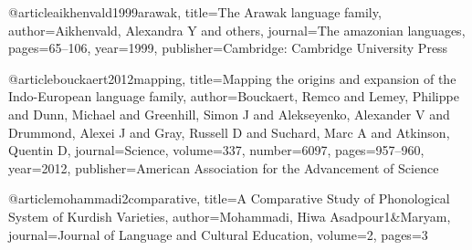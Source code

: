 @article{aikhenvald1999arawak,
  title={The Arawak language family},
  author={Aikhenvald, Alexandra Y and others},
  journal={The amazonian languages},
  pages={65--106},
  year={1999},
  publisher={Cambridge: Cambridge University Press}
}

@article{bouckaert2012mapping,
	title={Mapping the origins and expansion of the Indo-European language family},
	author={Bouckaert, Remco and Lemey, Philippe and Dunn, Michael and Greenhill, Simon J and Alekseyenko, Alexander V and Drummond, Alexei J and Gray, Russell D and Suchard, Marc A and Atkinson, Quentin D},
	journal={Science},
	volume={337},
	number={6097},
	pages={957--960},
	year={2012},
	publisher={American Association for the Advancement of Science}
}

@article{mohammadi2comparative,
	title={A Comparative Study of Phonological System of Kurdish Varieties},
	author={Mohammadi, Hiwa Asadpour1\&Maryam},
	journal={Journal of Language and Cultural Education},
	volume={2},
	pages={3}
}